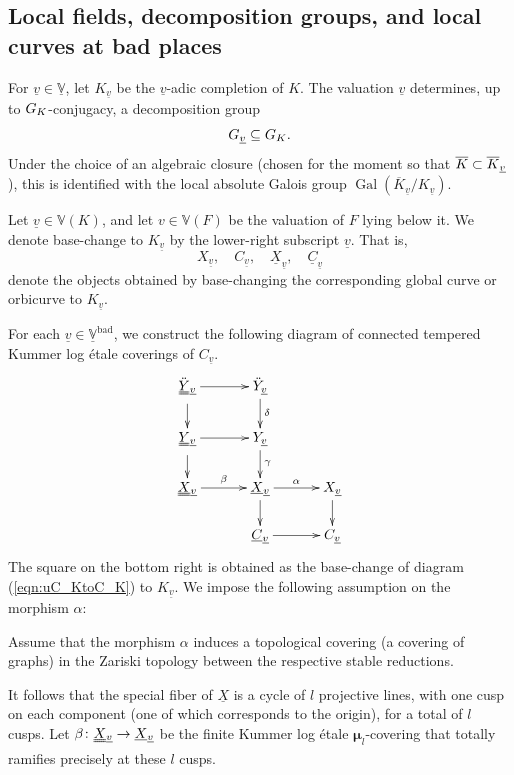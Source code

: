 \documentclass[12pt, reqno, a4paper]{amsart}
\def\udl#1{\underline{#1}} %
\def\uudl#1{\uuline{#1}} %
\def\ovl#1{\overline{#1}} %
\def\bV{\mathbb{V}}
\def\uX{\udl{X}} %
\def\uC{\udl{C}} %
\def\uV{\udl{\bV}} %
\def\uv{\udl{v}} %
\def\uuX{\uudl{X}{}} %
\def\uuY{\uudl{Y}{}} %
\def\bmu{\bm{\mu}}
\def\bad{\mathrm{bad}}
\DeclareMathOperator{\Gal}{Gal}
\begin{document}
\subsection{Local fields, decomposition groups, and local curves at bad places}\label{sub:localCurves}
For \(\uv\in\uV\), let \(K_{\uv}\) be the \(\uv\)-adic completion of \(K\).
The valuation \(\uv\) determines, up to $\GG_K$-conjugacy, a decomposition group
\begin{equation*}
  \GG_{\uv}\subseteq \GG_K.
\end{equation*}
Under the choice of an algebraic closure (chosen for the moment so that $\oK\subset\oK_{\uv}$), this is identified with the local absolute Galois group $\Gal(\ovl{K}_{\uv}/K_{\uv})$.

\begin{ntn}
Let \(\uv\in\bV(K)\), and let \(v\in\bV(F)\) be the valuation of \(F\) lying below it.
We denote base-change to \(K_{\uv}\) by the lower-right subscript \(\uv\).
That is,
\begin{equation*}
  X_{\uv},\quad C_{\uv},\quad \uX_{\uv},\quad \uC_{\uv}
\end{equation*}
denote the objects obtained by base-changing the corresponding global curve or orbicurve to \(K_{\uv}\).
\end{ntn}


For each $\uv\in\uV^{\bad}$, we construct the following diagram of connected tempered Kummer log \'etale coverings of $C_{\uv}$.
\[
\xymatrix@R=1.6em@C=3.2em{
\ddot{\uuY}{}_{\uv}\ar[r]\ar[d]&\ddot{Y}_{\uv}\ar[d]^{\delta}&\\
\uuY{}_{\uv}\ar[r]\ar[d]&Y_{\uv}\ar[d]^{\gamma}&\\
\uuX{}_{\uv}\ar[r]^{\beta}&\uX{}_{\uv}\ar[r]^{\alpha}\ar[d]&X_{\uv}\ar[d]\\
&\uC{}_{\uv}\ar[r]&C_{\uv}
}
\]
The square on the bottom right is obtained as the base-change of diagram (\ref{eqn:uC_KtoC_K}) to $K_{\uv}$.
We impose the following assumption on the morphism $\alpha$:
\begin{assum}\label{assum:uXtopologicalOverX}
Assume that the morphism $\alpha$ induces a topological covering (a covering of graphs) in the Zariski topology between the respective stable reductions.
\end{assum}

It follows that the special fiber of $\uX$ is a cycle of $l$ projective lines, with one cusp on each component (one of which corresponds to the origin), for a total of $l$ cusps.
Let $\beta\colon \uuX{}_{\uv} \to \uX{}_{\uv}$ be the finite Kummer log {\'e}tale $\bmu_l$-covering that totally ramifies precisely at these $l$ cusps.
\end{document}
